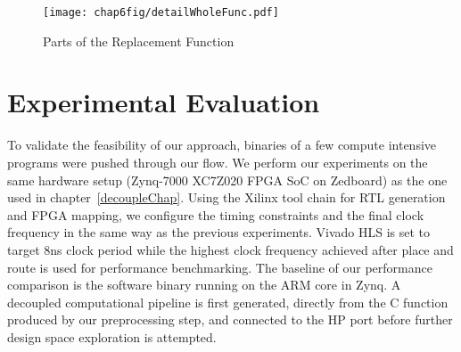 




\begin{figure}[htp]
\begin{center}
\texttt{[image: chap6fig/detailWholeFunc.pdf]}
\caption{Parts of the Replacement Function
\label{fig:detailWholeFunc}}
\end{center}
\end{figure}





\section{Experimental Evaluation }
\label{biev}

To validate the feasibility of our approach, binaries
of a few compute intensive programs were pushed through our flow.
We perform our experiments on the same hardware setup (Zynq-7000 XC7Z020 FPGA SoC on Zedboard) as the one used in 
chapter~\ref{decoupleChap}. Using the Xilinx tool chain for RTL generation and FPGA mapping, we configure the timing constraints   
and the final clock frequency %
in the same way as the previous experiments. Vivado HLS is set to target 8ns clock period while the highest clock frequency achieved after place and route is used for performance benchmarking. The baseline of our performance comparison is the software binary running on the ARM core in Zynq. %
A decoupled computational pipeline is first generated, directly from the C function produced by our preprocessing step, and connected to the HP port before further design space exploration is attempted.


